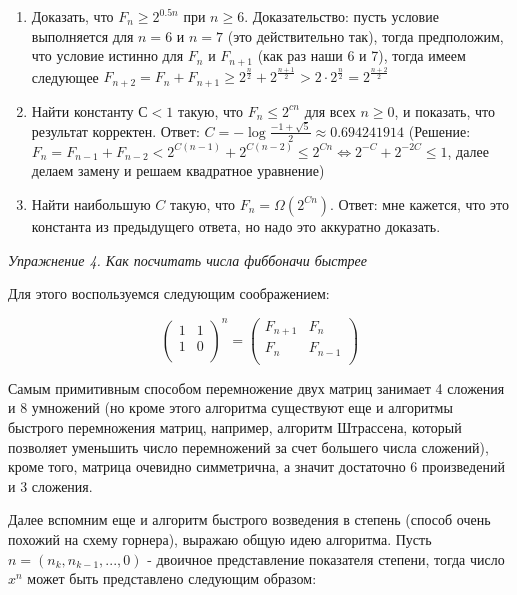 \begin{enumerate}
\item Доказать, что $ F _n \ge 2^{0.5n} $ при $ n \ge 6 $. Доказательство: пусть условие выполняется для $ n = 6 $ и $ n = 7 $ (это действительно так), тогда предположим, что условие истинно для $ F _n $ и $ F _{n+1} $ (как раз наши 6 и 7), тогда имеем следующее $ F _{n+2} = F _n + F _{n+1} \ge 2^{\frac{n}{2}} + 2^{\frac{n+1}{2}} > 2 \cdot 2^{\frac{n}{2}} = 2^{\frac{n+2}{2}} $

\item Найти константу $ С < 1 $ такую, что $ F _n \le 2^{cn} $ для всех $ n \ge 0 $, и показать, что результат корректен. Ответ: $ C = - \log \frac{-1 + \sqrt{5}}{2} \approx 0.694241914 $ (Решение: $ F _n = F _{n-1} + F _{n-2} < 2^{C(n-1)} + 2^{C(n-2)} \le 2^{Cn} \Leftrightarrow 2^{-C} + 2^{-2C} \le 1$, далее делаем замену и решаем квадратное уравнение)

\item Найти наибольшую $ C $ такую, что $ F _n = \Omega ( 2^{Cn} ) $. Ответ: мне кажется, что это константа из предыдущего ответа, но надо это аккуратно доказать.
\end{enumerate}

\textit{Упражнение 4. Как посчитать числа фиббоначи быстрее}

Для этого воспользуемся следующим соображением:

\begin{equation}
	{\begin{pmatrix}
		1 & 1 \\
		1 & 0 \\
	\end{pmatrix}} ^ n =
	\begin{pmatrix}
		F _{n+1} & F _n \\
		F _n & F _{n-1} \\
	\end{pmatrix}
	\label{math::fib_matrix}
\end{equation}

Самым примитивным способом перемножение двух матриц занимает 4 сложения и 8 умножений (но кроме этого алгоритма существуют еще и алгоритмы быстрого перемножения матриц, например, алгоритм Штрассена, который позволяет уменьшить число перемножений за счет большего числа сложений), кроме того, матрица очевидно симметрична, а значит достаточно 6 произведений и 3 сложения.

Далее вспомним еще и алгоритм быстрого возведения в степень (способ очень похожий на схему горнера), выражаю общую идею алгоритма. Пусть $ n = ( n_k, n_{k-1}, ... , 0 )$ - двоичное представление показателя степени, тогда число $ x ^ n $ может быть представлено следующим образом:

